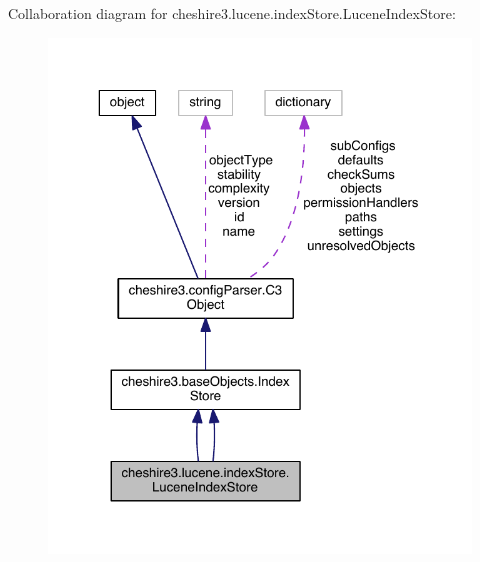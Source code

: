 Collaboration diagram for cheshire3.\-lucene.\-index\-Store.\-Lucene\-Index\-Store\-:
\nopagebreak
\begin{figure}[H]
\begin{center}
\leavevmode
\includegraphics[width=325pt]{classcheshire3_1_1lucene_1_1index_store_1_1_lucene_index_store__coll__graph}
\end{center}
\end{figure}
